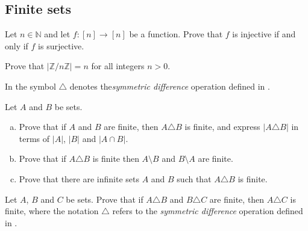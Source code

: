 
\subsection*{Finite sets}

\begin{chapex}
\label{cqFunctionInjectiveIffSurjective}
Let $n \in \mathbb{N}$ and let $f : [n] \to [n]$ be a function. Prove that $f$ is injective if and only if $f$ is surjective.
\end{chapex}

\begin{chapex}
\label{cqSizeOfZModN}
Prove that $|\mathbb{Z}/n\mathbb{Z}|=n$ for all integers $n > 0$.
\end{chapex}

In  the symbol $\triangle$ denotes the\textit{symmetric difference} operation defined in .

\begin{chapex}
\label{cqFiniteSymmetricDifferenceBegin}
\label{cqSizeOfSymmetricDifference}
Let $A$ and $B$ be sets.
\begin{enumerate}[(a)]
\item Prove that if $A$ and $B$ are finite, then $A \triangle B$ is finite, and express $|A \triangle B|$ in terms of $|A|$, $|B|$ and $|A \cap B|$.
\item Prove that if $A \triangle B$ is finite then $A \setminus B$ and $B \setminus A$ are finite.
\item Prove that there are infinite sets $A$ and $B$ such that $A \triangle B$ is finite.
\end{enumerate}
\end{chapex}

\begin{chapex}
\label{cqFiniteSymmetricDifferenceEnd}
\label{cqSymmetricDifferenceTwoOfThree}
Let $A$, $B$ and $C$ be sets. Prove that if $A \triangle B$ and $B \triangle C$ are finite, then $A \triangle C$ is finite, where the notation $\triangle$ refers to the \textit{symmetric difference} operation defined in .
\end{chapex}

